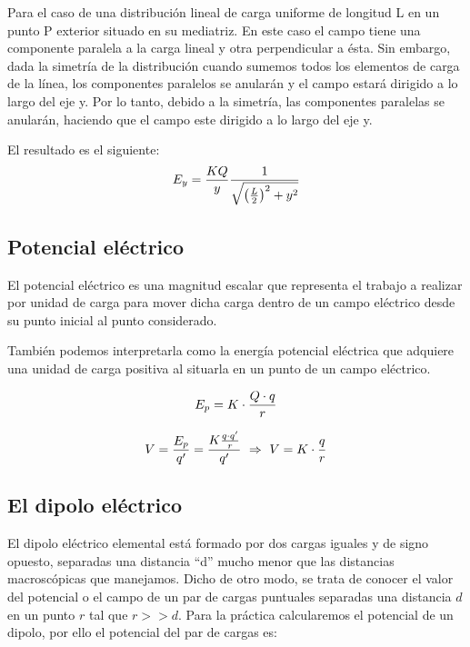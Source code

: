 \documentclass[11pt]{article}
\begin{document}
    \vspace{0.4cm}Para el caso de una distribución lineal de carga uniforme de longitud L en un punto P exterior situado en su mediatriz. En este caso el campo tiene una componente paralela a la carga lineal y otra perpendicular a ésta. Sin embargo, dada la simetría de la distribución cuando sumemos todos los elementos de carga de la línea, los componentes paralelos se anularán y el campo estará dirigido a lo largo del eje y. Por lo tanto, debido a la simetría, las componentes paralelas se anularán, haciendo que el campo este dirigido a lo largo del eje y.
    
    \vspace{0.6cm}El resultado es el siguiente:
    \vspace{-0.62cm}\begin{equation}
        \centering
        E_{y}=\frac{KQ}{y}\frac{1}{\sqrt{\left( \frac{L}{2}\right )^{2}+y^2}}
    \end{equation}
    
\subsection{Potencial eléctrico}
    El potencial eléctrico es una magnitud escalar que representa el trabajo a realizar por unidad de carga para mover dicha carga dentro de un campo eléctrico desde su punto inicial al punto considerado. 
    
    \vspace{5mm}
    También podemos interpretarla como la energía potencial eléctrica que adquiere una unidad de carga positiva al situarla en un punto de un campo eléctrico.

    \begin{equation}
        \centering
        E_{p}=K\cdot\frac{Q\cdot q}{r}
        \label{Ec:Ep}
    \end{equation}

    \begin{equation}
        \centering
        V=\frac{E_{p}}{q'}=\frac{K\frac{q\cdot q'}{r}}{q'}\  \Rightarrow \ V=K\cdot \frac{q}{r}
        \label{Ec:V}
    \end{equation}

\subsection{El dipolo eléctrico}
    El dipolo eléctrico elemental está formado por dos cargas iguales y de signo opuesto, separadas una distancia “d” mucho menor que las distancias macroscópicas que manejamos. Dicho de otro modo, se trata de conocer el valor del potencial o el campo de un par de cargas puntuales separadas una distancia $d$ en un punto $r$ tal que $r>>d$.
    \vspace{5mm}
    \newline Para la práctica calcularemos el potencial de un dipolo, por ello el potencial del par de cargas es:
    
\end{document}
